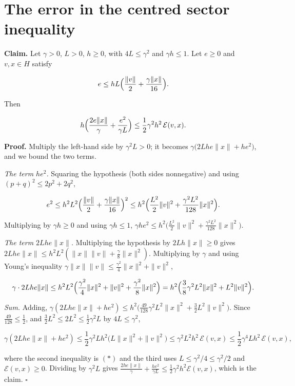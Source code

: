 \documentclass[11pt,a4paper]{article}
\begin{document}
\section{\texorpdfstring{The error in the centred sector inequality}{The error in the centred sector inequality}}


\textbf{Claim.} Let \(\gamma>0\), \(L>0\), \(h\ge0\), with \(4L\le\gamma^2\) and \(\gamma h\le1\). Let \(e\ge0\) and \(v,x\in H\) satisfy


\[e\le hL\Bigl(\frac{\|v\|}2+\frac{\gamma\|x\|}{16}\Bigr).\]


Then


\[h\Bigl(\frac{2e\|x\|}{\gamma}+\frac{e^2}{\gamma L}\Bigr)\le\frac12\gamma^2h^2\,\mathcal E(v,x).\]


\textbf{Proof.} Multiply the left-hand side by \(\gamma^2L>0\); it becomes \(\gamma\bigl(2Lhe\|x\|+he^2\bigr)\), and we bound the two terms.




\emph{The term \(he^2\).} Squaring the hypothesis (both sides nonnegative) and using \((p+q)^2\le2p^2+2q^2\),


\[e^2\le h^2L^2\Bigl(\frac{\|v\|}2+\frac{\gamma\|x\|}{16}\Bigr)^2\le h^2\Bigl(\frac{L^2}2\|v\|^2+\frac{\gamma^2L^2}{128}\|x\|^2\Bigr).\]


Multiplying by \(\gamma h\ge0\) and using \(\gamma h\le1\), \(\gamma he^2\le h^2\bigl(\frac{L^2}2\|v\|^2+\frac{\gamma^2L^2}{128}\|x\|^2\bigr)\).




\emph{The term \(2Lhe\|x\|\).} Multiplying the hypothesis by \(2Lh\|x\|\ge0\) gives \(2Lhe\|x\|\le h^2L^2(\|x\|\|v\|+\frac\gamma8\|x\|^2)\). Multiplying by \(\gamma\) and using Young's inequality \(\gamma\|x\|\|v\|\le\frac{\gamma^2}4\|x\|^2+\|v\|^2\),


\[\gamma\cdot2Lhe\|x\|\le h^2L^2\Bigl(\frac{\gamma^2}4\|x\|^2+\|v\|^2+\frac{\gamma^2}8\|x\|^2\Bigr)=h^2\Bigl(\frac38\gamma^2L^2\|x\|^2+L^2\|v\|^2\Bigr).\]


\emph{Sum.} Adding, \(\gamma(2Lhe\|x\|+he^2)\le h^2\bigl(\frac{49}{128}\gamma^2L^2\|x\|^2+\frac32L^2\|v\|^2\bigr)\). Since \(\frac{49}{128}\le\frac12\), and \(\frac32L^2\le2L^2\le\frac12\gamma^2L\) by \(4L\le\gamma^2\),


\[\gamma(2Lhe\|x\|+he^2)\le\frac12\gamma^2Lh^2\bigl(L\|x\|^2+\|v\|^2\bigr)\le\gamma^2L^2h^2\,\mathcal E(v,x)\le\frac12\gamma^4Lh^2\,\mathcal E(v,x),\]


where the second inequality is \((\ast)\) and the third uses \(L\le\gamma^2/4\le\gamma^2/2\) and \(\mathcal E(v,x)\ge0\). Dividing by \(\gamma^2L\) gives \(\frac{2he\|x\|}{\gamma}+\frac{he^2}{\gamma L}\le\frac12\gamma^2h^2\mathcal E(v,x)\), which is the claim. \(\square\)
\end{document}
